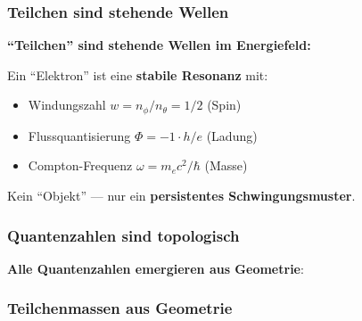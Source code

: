 	\subsubsection{Teilchen sind stehende Wellen}

	\begin{keyresult}
		\textbf{\enquote{Teilchen} sind stehende Wellen im Energiefeld:}

		\vspace{0.3cm}

		Ein \enquote{Elektron} ist eine \textbf{stabile Resonanz} mit:
		\begin{itemize}
			\item Windungszahl $w = n_\phi/n_\theta = 1/2$ (Spin)
			\item Flussquantisierung $\Phi = -1 \cdot h/e$ (Ladung)
			\item Compton-Frequenz $\omega = m_e c^2 / \hbar$ (Masse)
		\end{itemize}

		\vspace{0.3cm}

		Kein \enquote{Objekt} — nur ein \textbf{persistentes Schwingungsmuster}.
	\end{keyresult}

	\subsubsection{Quantenzahlen sind topologisch}

	\textbf{Alle Quantenzahlen emergieren aus Geometrie}:

	\begin{center}
	\end{center}

	\subsubsection{Teilchenmassen aus Geometrie}

